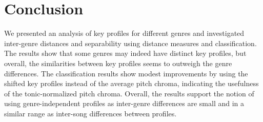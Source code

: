 \documentclass{article}
\begin{document}





\section{Conclusion}
We presented an analysis of key profiles for different genres and investigated inter-genre distances and separability using distance measures and classification. The results show that some genres may indeed have distinct key profiles, but overall, the similarities between key profiles seems to outweigh the genre differences. The classification results show modest improvements by using the shifted key profiles instead of the average pitch chroma, indicating the usefulness of the tonic-normalized pitch chroma. %
%
Overall, the results support the notion of using genre-independent profiles as inter-genre differences are small and in a similar range as inter-song differences between profiles. 
\end{document}
